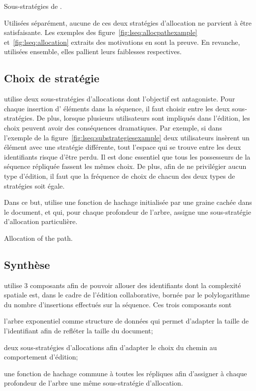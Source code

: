 \begin{algorithm}
  
  \caption{\label{algo:lseq:substrategies}Sous-stratégies de \LSEQ.}
\end{algorithm}

Utilisées séparément, aucune de ces deux stratégies d'allocation ne parvient à
être satisfaisante. Les exemples des figure~\ref{fig:lseq:allocpathexample}
et~\ref{fig:lseq:allocation} extraits des motivations en sont la preuve. En
revanche, utilisées ensemble, elles pallient leurs faiblesses respectives.

\subsection{Choix de stratégie}

\LSEQ utilise deux sous-stratégies d'allocations dont l'objectif est
antagoniste. Pour chaque insertion d' éléments dans la séquence, il faut choisir
entre les deux sous-stratégies. De plus, lorsque plusieurs utilisateurs sont
impliqués dans l'édition, les choix peuvent avoir des conséquences dramatiques.
Par exemple, si dans l'exemple de la figure~\ref{fig:lseq:substrategiesexample}
deux utilisateurs insèrent un élément avec une stratégie différente, tout
l'espace qui se trouve entre les deux identifiants risque d'être perdu. Il est
donc essentiel que tous les possesseurs de la séquence répliquée fassent les
mêmes choix. De plus, afin de ne privilégier aucun type d'édition, il faut que
la fréquence de choix de chacun des deux types de stratégies soit égale.

Dans ce but, \LSEQ utilise une fonction de hachage initialisée par une graine
cachée dans le document, et qui, pour chaque profondeur de l'arbre, assigne une
sous-stratégie d'allocation particulière.

\begin{algorithm}
  
  \caption{\label{algo:lseq:allocpath}Allocation of the path.}
\end{algorithm}

\subsection{Synthèse}

\LSEQ utilise 3 composants afin de pouvoir allouer des identifiants dont la
complexité spatiale est, dans le cadre de l'édition collaborative, bornée par le
polylogarithme du nombre d'insertions effectués sur la séquence. Ces trois
composants sont
\begin{inparaenum}[(i)]
\item l'arbre exponentiel comme structure de données qui permet d'adapter la
  taille de l'identifiant afin de refléter la taille du document;
\item deux sous-stratégies d'allocations afin d'adapter le choix du chemin au
  comportement d'édition;
\item une fonction de hachage commune à toutes les répliques afin d'assigner à chaque
 profondeur de l'arbre une même sous-stratégie d'allocation.
\end{inparaenum}

